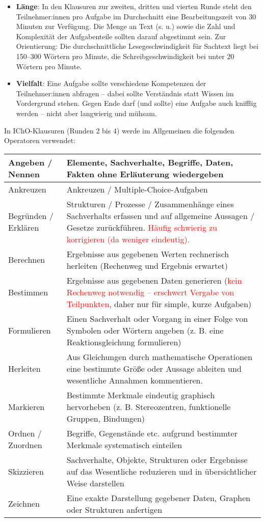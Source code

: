 \documentclass[./main.tex]{subfiles}
\begin{document}
\begin{itemize}
    \item \textbf{L\"ange}: In den Klausuren zur zweiten, dritten und vierten Runde steht den Teilnehmer:innen pro Aufgabe im Durchschnitt eine Bearbeitungszeit von 30 Minuten zur Verf\"ugung. Die Menge an Text (s. u.) sowie die Zahl und Komplexit\"at der Aufgabenteile sollten darauf abgestimmt sein. Zur Orientierung: Die durchschnittliche Lesegeschwindigkeit f\"ur Sachtext liegt bei 150--300 W\"ortern pro Minute, die Schreibgeschwindigkeit bei unter 20 W\"ortern pro Minute.
    \item \textbf{Vielfalt}: Eine Aufgabe sollte verschiedene Kompetenzen der Teilnehmer:innen abfragen -- dabei sollte Verst\"andnis statt Wissen im Vordergrund stehen. Gegen Ende darf (und sollte) eine Aufgabe auch knifflig werden -- nicht aber langwierig und m\"uhsam. 
\end{itemize}
\newpage
In IChO-Klausuren (Runden 2 bis 4) werde im Allgemeinen die folgenden Operatoren verwendet:\\
\begin{tabular}{|C{2.2cm}|L{13.7cm}|}\hline
Angeben / Nennen & Elemente, Sachverhalte, Begriffe, Daten, Fakten ohne Erl\"auterung wiedergeben \\\hline
Ankreuzen & Ankreuzen / Multiple-Choice-Aufgaben \\\hline
Begr\"unden / Erkl\"aren & Strukturen / Prozesse / Zusammenh\"ange eines Sachverhalts erfassen und auf allgemeine Aussagen / Gesetze zur\"uckf\"uhren.\newline
\textcolor{red}{H\"aufig schwierig zu korrigieren (da weniger eindeutig).} \\\hline
Berechnen & Ergebnisse aus gegebenen Werten rechnerisch herleiten (Rechenweg und Ergebnis erwartet)\\\hline
Bestimmen & Ergebnisse aus gegebenen Daten generieren (\textcolor{red}{kein Rechenweg notwendig -- erschwert Vergabe von Teilpunkten}, daher nur f\"ur simple, kurze Aufgaben)\\\hline
Formulieren & Einen Sachverhalt oder Vorgang in einer Folge von Symbolen oder W\"ortern angeben (z. B. eine Reaktionsgleichung formulieren) \\\hline
Herleiten & Aus Gleichungen durch mathematische Operationen eine bestimmte Gr\"o\ss{}e oder Aussage ableiten und wesentliche Annahmen kommentieren. \\\hline
Markieren & Bestimmte Merkmale eindeutig graphisch hervorheben
(z. B. Stereozentren, funktionelle Gruppen, Bindungen) \\\hline
Ordnen / Zuordnen & Begriffe, Gegenst\"ande etc. aufgrund bestimmter Merkmale systematisch einteilen \\\hline
Skizzieren & Sachverhalte, Objekte, Strukturen oder Ergebnisse auf das Wesentliche reduzieren und in \"ubersichtlicher Weise darstellen \\\hline
Zeichnen & Eine exakte Darstellung gegebener Daten, Graphen oder Strukturen anfertigen \\\hline
\end{tabular}
\end{document}
